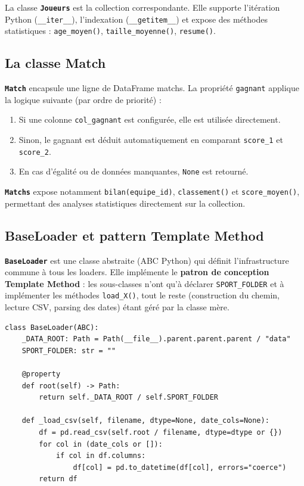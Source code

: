 \documentclass[12pt,a4paper]{article}
\newcommand{\code}[1]{\texttt{#1}}
\newcommand{\classe}[1]{\texttt{\textbf{#1}}}
\begin{document}
La classe \classe{Joueurs} est la collection correspondante. Elle supporte
l'itération Python (\code{\_\_iter\_\_}), l'indexation (\code{\_\_getitem\_\_})
et expose des méthodes statistiques : \code{age\_moyen()},
\code{taille\_moyenne()}, \code{resume()}.

\subsection{La classe Match}

\classe{Match} encapsule une ligne de DataFrame matchs. La propriété
\code{gagnant} applique la logique suivante (par ordre de priorité) :
\begin{enumerate}
  \item Si une colonne \code{col\_gagnant} est configurée, elle est utilisée
        directement.
  \item Sinon, le gagnant est déduit automatiquement en comparant
        \code{score\_1} et \code{score\_2}.
  \item En cas d'égalité ou de données manquantes, \code{None} est retourné.
\end{enumerate}

\classe{Matchs} expose notamment \code{bilan(equipe\_id)},
\code{classement()} et \code{score\_moyen()}, permettant des analyses
statistiques directement sur la collection.

\subsection{BaseLoader et pattern Template Method}

\classe{BaseLoader} est une classe abstraite (ABC Python) qui définit
l'infrastructure commune à tous les loaders. Elle implémente le
\textbf{patron de conception Template Method} : les sous-classes n'ont
qu'à déclarer \code{SPORT\_FOLDER} et à implémenter les méthodes
\code{load\_X()}, tout le reste (construction du chemin, lecture CSV, parsing
des dates) étant géré par la classe mère.

\begin{lstlisting}[caption={BaseLoader.py -- classe de base pour tous les loaders}]
class BaseLoader(ABC):
    _DATA_ROOT: Path = Path(__file__).parent.parent.parent / "data"
    SPORT_FOLDER: str = ""

    @property
    def root(self) -> Path:
        return self._DATA_ROOT / self.SPORT_FOLDER

    def _load_csv(self, filename, dtype=None, date_cols=None):
        df = pd.read_csv(self.root / filename, dtype=dtype or {})
        for col in (date_cols or []):
            if col in df.columns:
                df[col] = pd.to_datetime(df[col], errors="coerce")
        return df
\end{lstlisting}
\end{document}
